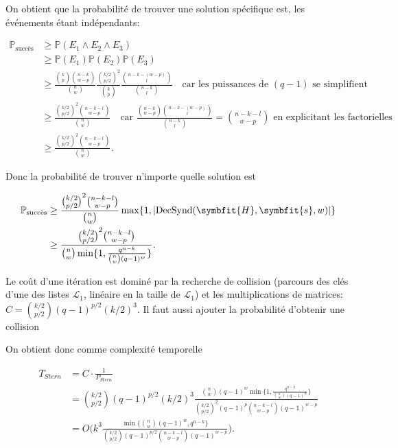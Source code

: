 \documentclass[a4paper,11pt,headings=small,footinclude=false]{scrartcl}
\theoremstyle{definition}
\theoremstyle{remark}
\begin{document}
On obtient que la probabilité de trouver une solution spécifique est, les événements étant indépendants:

\begin{align*}
\mathbb{P}_{\text{succès}} &\geq \mathbb{P}(E_1 \wedge E_2 \wedge E_3)\\
&\geq \mathbb{P}(E_1) \mathbb{P}(E_2) \mathbb{P}(E_3) \\
&\geq \frac{\binom{k}{p}\binom{n-k}{w-p}}{\binom{n}{w}} \frac{\binom{k/2}{p/2}^2}{\binom{k}{p}} \frac{\binom{n-k-(w-p)}{l}}{\binom{n-k}{l}} \quad \text{car les puissances de } (q-1) \text{ se simplifient}\\
&\geq \frac{\binom{k/2}{p/2}^2\binom{n-k-l}{w-p}}{\binom{n}{w}} \quad \text{car } \frac{\binom{n-k}{w-p}\binom{n-k-(w-p)}{l}}{\binom{n-k}{l}} = \binom{n-k-l}{w-p} \text{ en explicitant les factorielles}\\
&\geq \frac{\binom{k/2}{p/2}^2\binom{n-k-l}{w-p}}{\binom{n}{w}}.
\end{align*}

Donc la probabilité de trouver n'importe quelle solution est

\begin{align*}
\mathbb{P}_{\text{succès}} &\geq \frac{\binom{k/2}{p/2}^2\binom{n-k-l}{w-p}}{\binom{n}{w}}\max \{ 1, |\text{DecSynd}(\symbfit{H},\symbfit{s},w)| \}\\
&\geq \frac{\binom{k/2}{p/2}^2\binom{n-k-l}{w-p}}{\binom{n}{w} \min \{ 1, \frac{q^{n-k}}{\binom{n}{w}(q-1)^w} \}}.
\end{align*}

Le coût d'une itération est dominé par la recherche de collision (parcours des clés d'une des listes $\mathcal{L}_1$, linéaire en la taille de $\mathcal{L}_1$) et les multiplications de matrices: $C=\binom{k/2}{p/2}(q-1)^{p/2}(k/2)^3$.
Il faut aussi ajouter la probabilité d'obtenir une collision

On obtient donc comme complexité temporelle

\begin{align*}
	T_{Stern} &= C \cdot \frac{1}{P_{Stern}}\\
	&= \binom{k/2}{p/2}(q-1)^{p/2}(k/2)^3 \frac{\binom{n}{w}(q-1)^w \min \{ 1, \frac{q^{n-k}}{\binom{n}{w}(q-1)^w} \} }{\binom{k/2}{p/2}^2 (q-1)^p \binom{n-k-l}{w-p}(q-1)^{w-p}}\\
	&= O\Big(k^3 \frac{\min \{ \binom{n}{w}(q-1)^w, q^{n-k}\} }{\binom{k/2}{p/2} (q-1)^{p/2} \binom{n-k-l}{w-p}(q-1)^{w-p}}\Big).
\end{align*}
\end{document}
